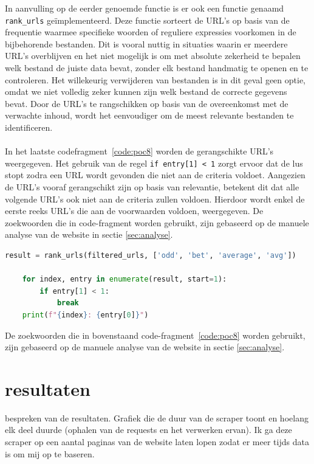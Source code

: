 In aanvulling op de eerder genoemde functie is er ook een functie genaamd \texttt{rank\_urls} geïmplementeerd. Deze functie sorteert de URL's op basis van de frequentie waarmee specifieke woorden of reguliere expressies voorkomen in de bijbehorende bestanden. Dit is vooral nuttig in situaties waarin er meerdere URL's overblijven en het niet mogelijk is om met absolute zekerheid te bepalen welk bestand de juiste data bevat, zonder elk bestand handmatig te openen en te controleren. Het willekeurig verwijderen van bestanden is in dit geval geen optie, omdat we niet volledig zeker kunnen zijn welk bestand de correcte gegevens bevat. Door de URL's te rangschikken op basis van de overeenkomst met de verwachte inhoud, wordt het eenvoudiger om de meest relevante bestanden te identificeren.
\\ \\
In het laatste codefragment~\ref{code:poc8} worden de gerangschikte URL's weergegeven. Het gebruik van de regel \lstinline|if entry[1] < 1| zorgt ervoor dat de lus stopt zodra een URL wordt gevonden die niet aan de criteria voldoet. Aangezien de URL's vooraf gerangschikt zijn op basis van relevantie, betekent dit dat alle volgende URL's ook niet aan de criteria zullen voldoen. Hierdoor wordt enkel de eerste reeks URL's die aan de voorwaarden voldoen, weergegeven.
De zoekwoorden die in code-fragment worden gebruikt, zijn gebaseerd op de manuele analyse van de website in sectie \ref{sec:analyse}.
\begin{lstlisting}[language=python, captionpos=b, caption={Filteren van performance-logs }, label={code:poc8}]
    result = rank_urls(filtered_urls, ['odd', 'bet', 'average', 'avg'])

    for index, entry in enumerate(result, start=1):
        if entry[1] < 1:
            break
    print(f"{index}: {entry[0]}")
\end{lstlisting}

De zoekwoorden die in bovenstaand code-fragment~\ref{code:poc8} worden gebruikt, zijn gebaseerd op de manuele analyse van de website in sectie \ref{sec:analyse}.

\section{resultaten}
bespreken van de resultaten. Grafiek die de duur van de scraper toont en hoelang elk deel duurde (ophalen van de requests en het verwerken ervan). Ik ga deze scraper op een aantal paginas van de website laten lopen zodat er meer tijds data is om mij op te baseren.
\\\\









